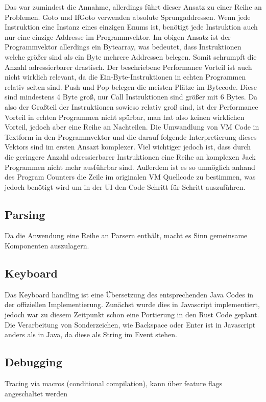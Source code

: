 Das war zumindest die Annahme, allerdings führt dieser Ansatz zu einer Reihe an Problemen. Goto und IfGoto verwenden absolute Sprungaddressen. Wenn jede Instruktion eine Instanz eines einzigen Enums ist, benötigt jede Instruktion auch nur eine einzige Addresse im Programmvektor. Im obigen Ansatz ist der Programmvektor allerdings ein Bytearray, was bedeutet, dass Instruktionen welche größer sind als ein Byte mehrere Addressen belegen. Somit schrumpft die Anzahl adressierbarer drastisch.
Der beschriebene Performance Vorteil ist auch nicht wirklich relevant, da die Ein-Byte-Instruktionen in echten Programmen relativ selten sind. Push und Pop belegen die meisten Plätze im Bytecode. Diese sind mindestens 4 Byte groß, nur Call Instruktionen sind größer mit 6 Bytes.
Da also der Großteil der Instruktionen sowieso relativ groß sind, ist der Performance Vorteil in echten Programmen nicht spürbar, man hat also keinen wirklichen Vorteil, jedoch aber eine Reihe an Nachteilen.
Die Umwandlung von VM Code in Textform in den Programmvektor und die darauf folgende Interpretierung dieses Vektors sind im ersten Ansazt komplexer.
Viel wichtiger jedoch ist, dass durch die geringere Anzahl adressierbarer Instruktionen eine Reihe an komplexen Jack Programmen nicht mehr ausführbar sind.
Außerdem ist es so unmöglich anhand des Program Counters die Zeile im originalen VM Quellcode zu bestimmen, was jedoch benötigt wird um in der UI den Code Schritt für Schritt auszuführen.

\subsection{Parsing}
Da die Anwendung eine Reihe an Parsern enthält, macht es Sinn gemeinsame Komponenten auszulagern.

\subsection{Keyboard}
Das Keyboard handling ist eine Übersetzung des entsprechenden Java Codes in der offiziellen Implementierung.
Zunächst wurde dies in Javascript implementiert, jedoch war zu diesem Zeitpunkt schon eine Portierung in den Rust Code geplant.
Die Verarbeitung von Sonderzeichen, wie Backspace oder Enter ist in Javascript anders als in Java, da diese als String im Event stehen.

\subsection{Debugging}
Tracing via macros (conditional compilation), kann über feature flags angeschaltet werden

